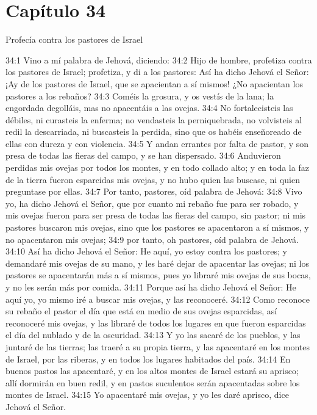 \section*{Capítulo 34 } 
Profecía contra los pastores de Israel 
  
34:1 Vino a mí palabra de Jehová, diciendo:   
34:2 Hijo de hombre, profetiza contra los pastores de Israel; profetiza, y di a los pastores: Así ha dicho Jehová el Señor: ¡Ay de los pastores de Israel, que se apacientan a sí mismos! ¿No apacientan los pastores a los rebaños?   
34:3 Coméis la grosura, y os vestís de la lana; la engordada degolláis, mas no apacentáis a las ovejas.   
34:4 No fortalecisteis las débiles, ni curasteis la enferma; no vendasteis la perniquebrada, no volvisteis al redil la descarriada, ni buscasteis la perdida, sino que os habéis enseñoreado de ellas con dureza y con violencia.   
34:5 Y andan errantes por falta de pastor, y son presa de todas las fieras del campo, y se han dispersado.   
34:6 Anduvieron perdidas mis ovejas por todos los montes, y en todo collado alto; y en toda la faz de la tierra fueron esparcidas mis ovejas, y no hubo quien las buscase, ni quien preguntase por ellas.   
34:7 Por tanto, pastores, oíd palabra de Jehová:   
34:8 Vivo yo, ha dicho Jehová el Señor, que por cuanto mi rebaño fue para ser robado, y mis ovejas fueron para ser presa de todas las fieras del campo, sin pastor; ni mis pastores buscaron mis ovejas, sino que los pastores se apacentaron a sí mismos, y no apacentaron mis ovejas;   
34:9 por tanto, oh pastores, oíd palabra de Jehová.   
34:10 Así ha dicho Jehová el Señor: He aquí, yo estoy contra los pastores; y demandaré mis ovejas de su mano, y les haré dejar de apacentar las ovejas; ni los pastores se apacentarán más a sí mismos, pues yo libraré mis ovejas de sus bocas, y no les serán más por comida.   
34:11 Porque así ha dicho Jehová el Señor: He aquí yo, yo mismo iré a buscar mis ovejas, y las reconoceré.   
34:12 Como reconoce su rebaño el pastor el día que está en medio de sus ovejas esparcidas, así reconoceré mis ovejas, y las libraré de todos los lugares en que fueron esparcidas el día del nublado y de la oscuridad.   
34:13 Y yo las sacaré de los pueblos, y las juntaré de las tierras; las traeré a su propia tierra, y las apacentaré en los montes de Israel, por las riberas, y en todos los lugares habitados del país.   
34:14 En buenos pastos las apacentaré, y en los altos montes de Israel estará su aprisco; allí dormirán en buen redil, y en pastos suculentos serán apacentadas sobre los montes de Israel.   
34:15 Yo apacentaré mis ovejas, y yo les daré aprisco, dice Jehová el Señor.   
